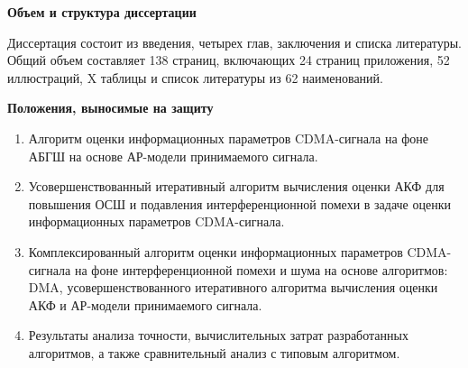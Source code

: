 {\bf{Объем и структура диссертации}}

Диссертация состоит из введения, четырех глав, заключения и списка литературы. Общий объем составляет 138 страниц, включающих 24 страниц приложения, 52 иллюстраций,
X таблицы и список литературы из 62 наименований.

{\bf{Положения, выносимые на защиту}}
\begin{enumerate}
	\item {Алгоритм оценки информационных параметров CDMA-сигнала на фоне АБГШ на основе АР-модели принимаемого сигнала.}
	\item {Усовершенствованный итеративный алгоритм вычисления оценки АКФ для повышения ОСШ и подавления интерференционной помехи в задаче оценки
		информационных параметров CDMA-сигнала.}
	\item {Комплексированный алгоритм оценки информационных параметров CDMA-сигнала на фоне интерференционной помехи и шума на основе алгоритмов:
		DMA, усовершенствованного итеративного алгоритма вычисления оценки АКФ и АР-модели принимаемого сигнала.}
	\item {Результаты анализа точности, вычислительных затрат разработанных алгоритмов, а также сравнительный анализ с типовым алгоритмом.}
\end{enumerate}

\clearpage
